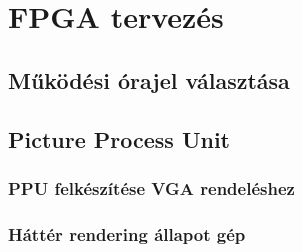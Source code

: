 \chapter{FPGA tervezés}

\section{Működési órajel választása}

\section{Picture Process Unit}

	\subsection{PPU felkészítése VGA rendeléshez}

	\subsection{Háttér rendering állapot gép}
	
